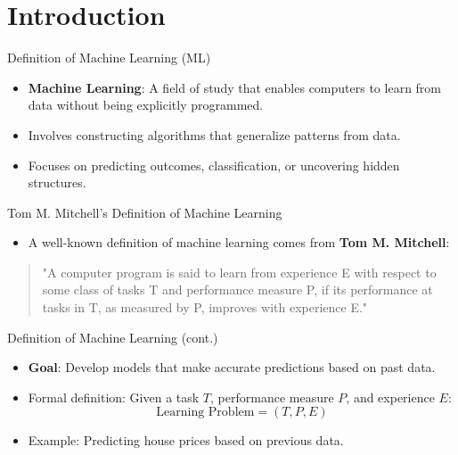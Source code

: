 \documentclass[serif, aspectratio=169]{beamer}
\begin{document}
\section{Introduction}

\begin{frame}{Definition of Machine Learning (ML)}
    \begin{itemize}
        \item \textbf{Machine Learning}: A field of study that enables computers to learn from data without being explicitly programmed.
        \item Involves constructing algorithms that generalize patterns from data.
        \item Focuses on predicting outcomes, classification, or uncovering hidden structures.
    \end{itemize}
\end{frame}
\begin{frame}{Tom M. Mitchell's Definition of Machine Learning}
    \begin{itemize}
        \item A well-known definition of machine learning comes from \textbf{Tom M. Mitchell}:
    \end{itemize}
        \begin{quote}
        "A computer program is said to learn from experience E with respect to some class of tasks T and performance measure P, if its performance at tasks in T, as measured by P, improves with experience E."
        \end{quote}
\end{frame}

\begin{frame}{Definition of Machine Learning (cont.)}
    \begin{itemize}
        \item \textbf{Goal}: Develop models that make accurate predictions based on past data.
        \item Formal definition: Given a task \(T\), performance measure \(P\), and experience \(E\):
        \[
        \text{Learning Problem} = (T, P, E)
        \]
        \item Example: Predicting house prices based on previous data.
    \end{itemize}
\end{frame}
\end{document}
